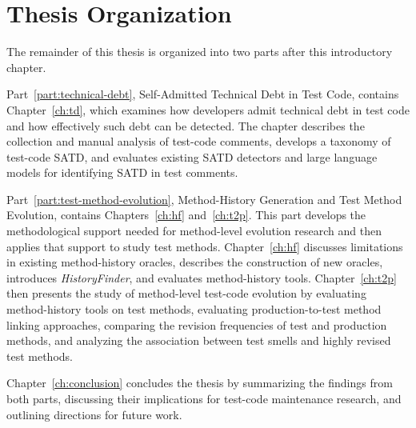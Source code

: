 \section{Thesis Organization}

The remainder of this thesis is organized into two parts after this introductory chapter.

Part~\ref{part:technical-debt}, Self-Admitted Technical Debt in Test Code, contains Chapter~\ref{ch:td}, which examines how developers admit technical debt in test code and how effectively such debt can be detected. The chapter describes the collection and manual analysis of test-code comments, develops a taxonomy of test-code SATD, and evaluates existing SATD detectors and large language models for identifying SATD in test comments.

Part~\ref{part:test-method-evolution}, Method-History Generation and Test Method Evolution, contains Chapters~\ref{ch:hf} and~\ref{ch:t2p}. This part develops the methodological support needed for method-level evolution research and then applies that support to study test methods. Chapter~\ref{ch:hf} discusses limitations in existing method-history oracles, describes the construction of new oracles, introduces \textit{HistoryFinder}, and evaluates method-history tools. Chapter~\ref{ch:t2p} then presents the study of method-level test-code evolution by evaluating method-history tools on test methods, evaluating production-to-test method linking approaches, comparing the revision frequencies of test and production methods, and analyzing the association between test smells and highly revised test methods.

Chapter~\ref{ch:conclusion} concludes the thesis by summarizing the findings from both parts, discussing their implications for test-code maintenance research, and outlining directions for future work.
